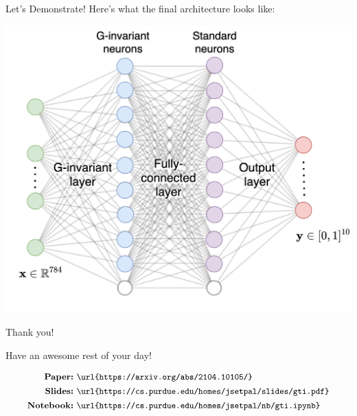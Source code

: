\documentclass{beamer}
\begin{document}
\begin{frame}{Let's Demonstrate!}
	Here's what the final architecture looks like:
	\begin{center}
		\includegraphics[width=.7\textwidth]{img/mlp.png}
	\end{center}
\end{frame}

\begin{frame}{Thank you!}
	\begin{center}
		Have an awesome rest of your day!
	\end{center}
	\begin{align*}
		\textbf{\small Paper:}&~\texttt{\small\url{https://arxiv.org/abs/2104.10105/}} \\
		\textbf{\small Slides:}&~\texttt{\small\url{https://cs.purdue.edu/homes/jsetpal/slides/gti.pdf}} \\
		\textbf{\small Notebook:}&~\texttt{\small\url{https://cs.purdue.edu/homes/jsetpal/nb/gti.ipynb}} \\
	\end{align*}
\end{frame}
\end{document}
